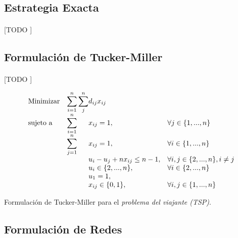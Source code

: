 \documentclass[spanish]{article}
\begin{document}
		\subsection{Estrategia Exacta}

			\paragraph{}
			[TODO ]

			\subsection{Formulación de Tucker-Miller}

				\paragraph{}
				[TODO ]

				\begin{eqfloat}
					\begin{equation}
						\begin{array}{ll@{}ll}
							\text{Minimizar}	& \displaystyle\sum\limits_{i = 1}^{n}\sum\limits_{j}^{n} & d_{ij}x_{ij} &\\
							\text{sujeto a}		& \displaystyle\sum\limits_{i = 1}^{n}	&	x_{ij} 	= 1,  & \forall j \in \{1,...,n\} \\
																& \displaystyle\sum\limits_{j = 1}^{n}	&	x_{ij} 	= 1,  & \forall i \in \{1,...,n\} \\
																& 				&	u_i - u_j + n x_{ij}	\leq n-1,  & \forall i, j \in \{2,...,n\}, i \neq j \\
																&                               &	u_{i} \in \{2,...,n\}, 		& \forall i \in \{2,...,n\} \\
																&                               &	u_{1}  = 1, 	& \\
																&                               &	x_{ij} \in \{0,1\}, 	& \forall i,j \in \{1,...,n\}
						\end{array}
					\end{equation}
					\caption{Formulación de Tucker-Miller para el \emph{problema del viajante (TSP)}.}
					\label{eq:tsp_tm}
				\end{eqfloat}

			\subsection{Formulación de Redes}
\end{document}
